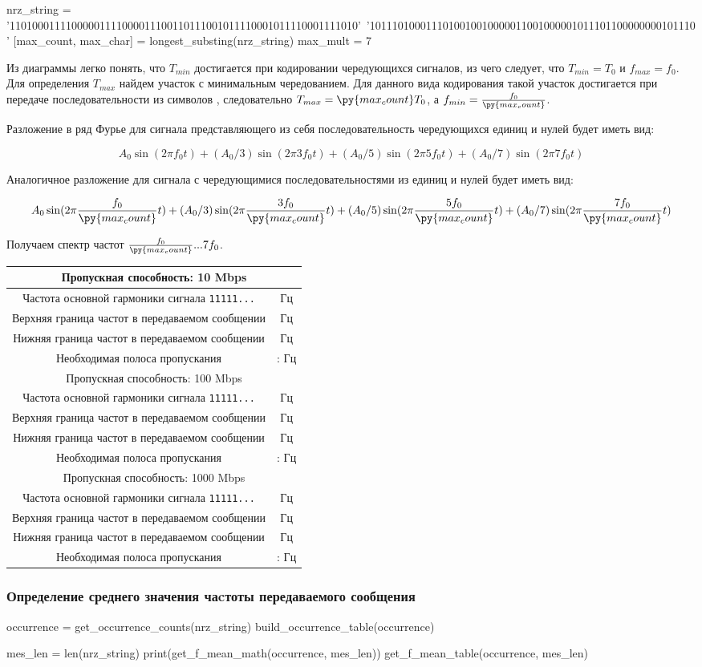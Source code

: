 \documentclass[12pt, a4paper]{article}
\newcommand{\bandwidthEntry}[2]{
  \hline
  \multicolumn{2}{|c|}{Пропускная способность: #1 Mbps} \\
  \hline
  Частота основной гармоники сигнала \texttt{11111...} & \py{int(f_0[#1] * #2)} Гц \\
  Верхняя граница частот в передаваемом сообщении & \py{int(max_mult * f_0[#1])} Гц \\
  Нижняя граница частот в передаваемом сообщении & \py{int(f_0[#1] / max_count)} Гц \\
  Необходимая полоса пропускания & \py{int(f_0[#1] / max_count)} : \py{int(max_mult * f_0[#1])} Гц \\
}
\begin{document}
\begin{pycode}
nrz_string = '11010001111000001111000011100110111001011110001011110001111010'\
  '1011101000111010010010000011001000001011101100000000101110'
[max_count, max_char] = longest_substing(nrz_string)
max_mult = 7
\end{pycode}

Из диаграммы легко понять, что $T_{min}$ достигается при кодировании чередующихся
сигналов, из чего следует, что $T_{min} = T_0$ и $f_{max} = f_0$. Для определения
$T_{max}$ найдем участок с минимальным чередованием. Для данного вида кодирования
такой участок достигается при передаче последовательности из \py{max_count}
символов \texttt{\py{max_char}},
следовательно $T_{max} = \py{max_count} T_0$, а $f_{min} = \frac{f_0}{\py{max_count}}$.

Разложение в ряд Фурье для сигнала представляющего из себя последовательность
чередующихся единиц и нулей будет иметь вид:

$$A_0 \sin(2 \pi f_0 t) + (A_0 / 3) \sin(2 \pi 3 f_0 t) +
  (A_0 / 5) \sin(2 \pi 5 f_0 t) + (A_0 / 7) \sin(2 \pi 7 f_0 t)$$

Аналогичное разложение для сигнала с чередующимися последовательностями из
\py{max_count} единиц и нулей будет иметь вид:

$$A_0 \sin(2 \pi \frac{f_0}{\py{max_count}} t) + (A_0 / 3) \sin(2 \pi \frac{3 f_0}{\py{max_count}} t) +
  (A_0 / 5) \sin(2 \pi \frac{5 f_0}{\py{max_count}} t) + (A_0 / 7) \sin(2 \pi \frac{7 f_0}{\py{max_count}} t)$$

Получаем спектр частот $\frac{f_0}{\py{max_count}}...7 f_0$.

\newpage

\begin{tabular}{| c | c |}
  \bandwidthEntry{10}{0}
  \bandwidthEntry{100}{0}
  \bandwidthEntry{1000}{0}
  \hline
\end{tabular}

\subsubsection*{Определение среднего значения чаcтоты передаваемого сообщения}

\begin{pycode}
occurrence = get_occurrence_counts(nrz_string)
build_occurrence_table(occurrence)

mes_len = len(nrz_string)
print(get_f_mean_math(occurrence, mes_len))
get_f_mean_table(occurrence, mes_len)
\end{pycode}
\end{document}
